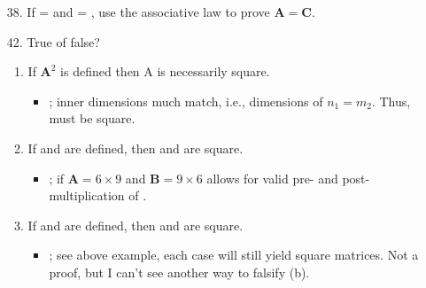 \begin{itemize}
{\begin{enumerate}
\begin{enumerate}
          \item Suppose all rows of  are \([1~2~4]\). Show by example that all
            rows of  are not \( [1~2~4] \). It is true that those rows
            are 
            \begin{itemize}\color{foreground}
              \item E.g., if \( e_{12} = 2 \), then \( m_2 \) of  would
                be \( [3~6~12] \)
            \end{itemize}

        \end{enumerate}

      \item[38.] If  =  and  = , use the
        associative law to prove \(\bm{A} = \bm{C}\).
        \vspace{-24pt}

      \item[42.] True of false?
        \begin{enumerate}
          \item If \( \bm{A}^2 \) is defined then A is necessarily square.
            \begin{itemize}\color{foreground}
              \item {}; inner dimensions much match, i.e.,
                dimensions of \( n_1 = m_2 \). Thus,  must be square.
            \end{itemize}

          \item If  and  are defined, then  and 
            are square.
            \begin{itemize}\color{foreground}
              \item {}; if \(\bm{A} = 6 \times 9 \) and \( \bm{B} =
                9 \times 6 \) allows for valid pre- and post-multiplication of
                .
            \end{itemize}


          \item If  and  are defined, then  and
             are square.
            \begin{itemize}\color{foreground}
              \item {}; see above example, each case will still yield
                square matrices. Not a proof, but I can't see another way to
                falsify (b).
            \end{itemize}


\end{enumerate}
\end{enumerate}}
\end{itemize}
